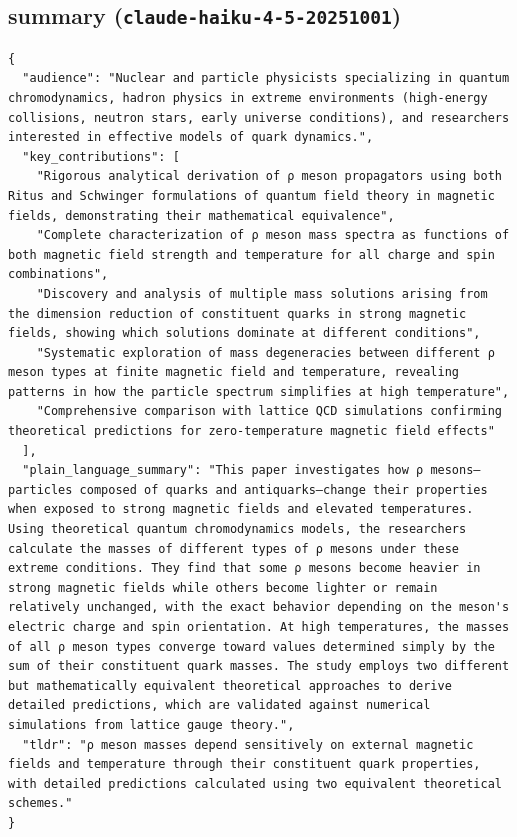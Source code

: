 \documentclass[11pt]{article}
\begin{document}
\subsection*{summary (\texttt{claude-haiku-4-5-20251001})}
\begin{verbatim}
{
  "audience": "Nuclear and particle physicists specializing in quantum chromodynamics, hadron physics in extreme environments (high-energy collisions, neutron stars, early universe conditions), and researchers interested in effective models of quark dynamics.",
  "key_contributions": [
    "Rigorous analytical derivation of ρ meson propagators using both Ritus and Schwinger formulations of quantum field theory in magnetic fields, demonstrating their mathematical equivalence",
    "Complete characterization of ρ meson mass spectra as functions of both magnetic field strength and temperature for all charge and spin combinations",
    "Discovery and analysis of multiple mass solutions arising from the dimension reduction of constituent quarks in strong magnetic fields, showing which solutions dominate at different conditions",
    "Systematic exploration of mass degeneracies between different ρ meson types at finite magnetic field and temperature, revealing patterns in how the particle spectrum simplifies at high temperature",
    "Comprehensive comparison with lattice QCD simulations confirming theoretical predictions for zero-temperature magnetic field effects"
  ],
  "plain_language_summary": "This paper investigates how ρ mesons—particles composed of quarks and antiquarks—change their properties when exposed to strong magnetic fields and elevated temperatures. Using theoretical quantum chromodynamics models, the researchers calculate the masses of different types of ρ mesons under these extreme conditions. They find that some ρ mesons become heavier in strong magnetic fields while others become lighter or remain relatively unchanged, with the exact behavior depending on the meson's electric charge and spin orientation. At high temperatures, the masses of all ρ meson types converge toward values determined simply by the sum of their constituent quark masses. The study employs two different but mathematically equivalent theoretical approaches to derive detailed predictions, which are validated against numerical simulations from lattice gauge theory.",
  "tldr": "ρ meson masses depend sensitively on external magnetic fields and temperature through their constituent quark properties, with detailed predictions calculated using two equivalent theoretical schemes."
}
\end{verbatim}
\end{document}
